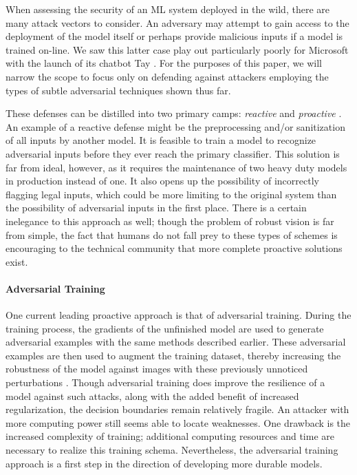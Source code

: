 \documentclass[]{article}
\begin{document}
When assessing the security of an ML system deployed in the wild, there are many attack vectors to consider. An adversary may attempt to gain access to the deployment of the model itself or perhaps provide malicious inputs if a model is trained on-line. We saw this latter case play out particularly poorly for Microsoft with the launch of its chatbot Tay \citep{lee2016}. For the purposes of this paper, we will narrow the scope to focus only on defending against attackers employing the types of subtle adversarial techniques shown thus far.

These defenses can be distilled into two primary camps: \textit{reactive} and \textit{proactive} \citep{mikhailov2017}. An example of a reactive defense might be the preprocessing and/or sanitization of all inputs by another model. It is feasible to train a model to recognize adversarial inputs before they ever reach the primary classifier. This solution is far from ideal, however, as it requires the maintenance of two heavy duty models in production instead of one. It also opens up the possibility of incorrectly flagging legal inputs, which could be more limiting to the original system than the possibility of adversarial inputs in the first place. There is a certain inelegance to this approach as well; though the problem of robust vision is far from simple, the fact that humans do not fall prey to these types of schemes is encouraging to the technical community that more complete proactive solutions exist.

\paragraph{Adversarial Training} One current leading proactive approach is that of adversarial training. During the training process, the gradients of the unfinished model are used to generate adversarial examples with the same methods described earlier. These adversarial examples are then used to augment the training dataset, thereby increasing the robustness of the model against images with these previously unnoticed perturbations \citep{DBLP:journals/corr/PapernotMSW16}. Though adversarial training does improve the resilience of a model against such attacks, along with the added benefit of increased regularization, the decision boundaries remain relatively fragile. An attacker with more computing power still seems able to locate weaknesses. One drawback is the increased complexity of training; additional computing resources and time are necessary to realize this training schema. Nevertheless, the adversarial training approach is a first step in the direction of developing more durable models.
\end{document}
